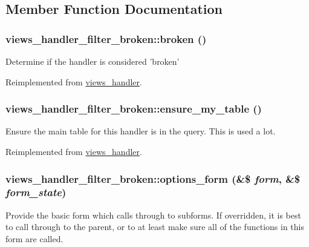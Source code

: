 \subsection{Member Function Documentation}
\hypertarget{classviews__handler__filter__broken_a912a78cd8ee1d5c139613d252f2ca9e1}{
\subsubsection[{broken}]{\setlength{\rightskip}{0pt plus 5cm}views\_\-handler\_\-filter\_\-broken::broken ()}}
\label{classviews__handler__filter__broken_a912a78cd8ee1d5c139613d252f2ca9e1}
Determine if the handler is considered 'broken' 

Reimplemented from \hyperlink{classviews__handler_ac1cd2ff30cb558c79cc908be516fb725}{views\_\-handler}.\hypertarget{classviews__handler__filter__broken_ae85934ec4cf9e01aba2b17ce58ead155}{
\subsubsection[{ensure\_\-my\_\-table}]{\setlength{\rightskip}{0pt plus 5cm}views\_\-handler\_\-filter\_\-broken::ensure\_\-my\_\-table ()}}
\label{classviews__handler__filter__broken_ae85934ec4cf9e01aba2b17ce58ead155}
Ensure the main table for this handler is in the query. This is used a lot. 

Reimplemented from \hyperlink{classviews__handler_a947f21ef0f21a77f4d103af4702b3600}{views\_\-handler}.\hypertarget{classviews__handler__filter__broken_a51fc714b7aec668a035da8dfb4b4a69a}{
\subsubsection[{options\_\-form}]{\setlength{\rightskip}{0pt plus 5cm}views\_\-handler\_\-filter\_\-broken::options\_\-form (\&\$ {\em form}, \/  \&\$ {\em form\_\-state})}}
\label{classviews__handler__filter__broken_a51fc714b7aec668a035da8dfb4b4a69a}
Provide the basic form which calls through to subforms. If overridden, it is best to call through to the parent, or to at least make sure all of the functions in this form are called. 

